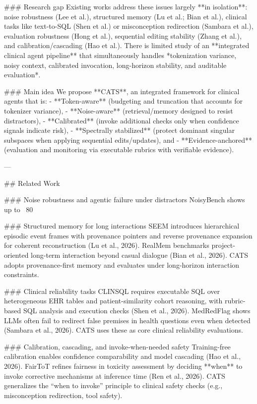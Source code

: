### Research gap  
Existing works address these issues largely **in isolation**: noise robustness (Lee et al.), structured memory (Lu et al.; Bian et al.), clinical tasks like text-to-SQL (Shen et al.) or misconception redirection (Sambara et al.), evaluation robustness (Hong et al.), sequential editing stability (Zhang et al.), and calibration/cascading (Hao et al.). There is limited study of an **integrated clinical agent pipeline** that simultaneously handles *tokenization variance, noisy context, calibrated invocation, long-horizon stability, and auditable evaluation*.

### Main idea  
We propose **CATS**, an integrated framework for clinical agents that is:  
- **Token-aware** (budgeting and truncation that accounts for tokenizer variance),  
- **Noise-aware** (retrieval/memory designed to resist distractors),  
- **Calibrated** (invoke additional checks only when confidence signals indicate risk),  
- **Spectrally stabilized** (protect dominant singular subspaces when applying sequential edits/updates), and  
- **Evidence-anchored** (evaluation and monitoring via executable rubrics with verifiable evidence).

---

## Related Work  

### Noise robustness and agentic failure under distractors  
NoisyBench shows up to ~80%

### Structured memory for long interactions  
SEEM introduces hierarchical episodic event frames with provenance pointers and reverse provenance expansion for coherent reconstruction (Lu et al., 2026). RealMem benchmarks project-oriented long-term interaction beyond casual dialogue (Bian et al., 2026). CATS adopts provenance-first memory and evaluates under long-horizon interaction constraints.

### Clinical reliability tasks  
CLINSQL requires executable SQL over heterogeneous EHR tables and patient-similarity cohort reasoning, with rubric-based SQL analysis and execution checks (Shen et al., 2026). MedRedFlag shows LLMs often fail to redirect false premises in health questions even when detected (Sambara et al., 2026). CATS uses these as core clinical reliability evaluations.

### Calibration, cascading, and invoke-when-needed safety  
Training-free calibration enables confidence comparability and model cascading (Hao et al., 2026). FairToT refines fairness in toxicity assessment by deciding **when** to invoke corrective mechanisms at inference time (Ren et al., 2026). CATS generalizes the “when to invoke” principle to clinical safety checks (e.g., misconception redirection, tool safety).

